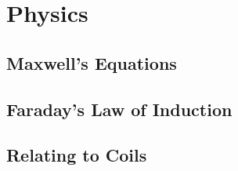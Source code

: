 \section{Physics}

    \subsection{Maxwell's Equations}

    \subsection{Faraday's Law of Induction}

    \subsection{Relating to Coils}
